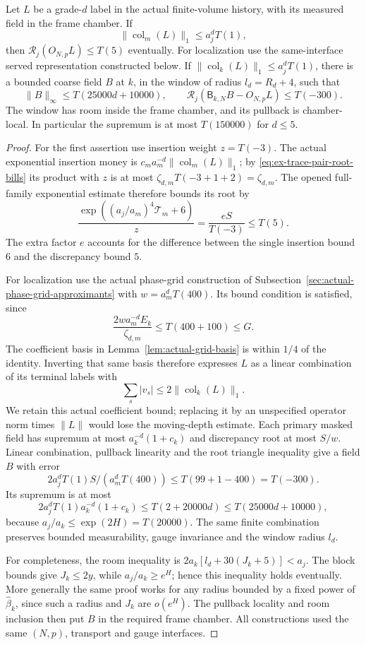 \begin{proposition}
\label{prop:ex-trace-pair-coefficient-production}
Let $L$ be a grade-$d$ label in the actual finite-volume history, with
its measured field in the frame chamber. If
\[
 \|\operatorname{col}_m(L)\|_1\le a_j^d T(1),
\]
then $\mathcal R_j(O_{N,p}L)\le T(5)$ eventually.
For localization use the same-interface served representation constructed
below. If
$\|\operatorname{col}_k(L)\|_1\le a_j^dT(1)$, there is a bounded
coarse field $B$ at $k$, in the window of radius
$l_d=R_d+4$, such that
\[
 \|B\|_\infty\le T(25000d+10000),\qquad
 \mathcal R_j(\mathsf B_{k,N}B-O_{N,p}L)\le T(-300).
\]
The window has room inside the frame chamber, and its pullback is
chamber-local. In particular the supremum is at most $T(150000)$
for $d\le5$.
\end{proposition}
\begin{proof}
For the first assertion use insertion weight $z=T(-3)$.
The actual exponential insertion money is
$c_m a_m^{-d}\|\operatorname{col}_m(L)\|_1$; by
\eqref{eq:ex-trace-pair-root-bills} its product with $z$ is at most
$\zeta_{d,m}T(-3+1+2)=\zeta_{d,m}$.
The opened full-family exponential estimate therefore bounds its root by
\[
 \frac{\exp((a_j/a_m)^4\mathcal T_m+6)}z
 =\frac{eS}{T(-3)}\le T(5).
\]
The extra factor $e$ accounts for the difference between the single
insertion bound $6$ and the discrepancy bound $5$.

For localization use the actual phase-grid construction of
Subsection~\ref{sec:actual-phase-grid-approximants} with
$w=a_m^dT(400)$. Its bound condition is satisfied, since
\[
 \frac{2wa_m^{-d}E_k}{\zeta_{d,m}}
 \le T(400+100)\le G.
\]
The coefficient basis in Lemma~\ref{lem:actual-grid-basis} is within
$1/4$ of the identity. Inverting that same basis therefore expresses
$L$ as a linear combination of its terminal labels with
\[
 \sum_s|v_s|\le2\|\operatorname{col}_k(L)\|_1.
\]
We retain this actual coefficient bound; replacing it by an unspecified
operator norm times $\|L\|$ would lose the moving-depth estimate.
Each primary masked field has supremum at most
$a_k^{-d}(1+c_k)$ and discrepancy root at most $S/w$.
Linear combination, pullback linearity and the root triangle inequality
give a field $B$ with error
\[
 2a_j^dT(1)S/(a_m^dT(400))\le T(99+1-400)=T(-300).
\]
Its supremum is at most
\[
 2a_j^dT(1)a_k^{-d}(1+c_k)
 \le T(2+20000d)\le T(25000d+10000),
\]
because $a_j/a_k\le\exp(2H)=T(20000)$.
The same finite combination preserves bounded measurability, gauge
invariance and the window radius $l_d$.

For completeness, the room inequality is
$2a_k[l_d+30(J_k+5)]<a_j$.
The block bounds give $J_k\le2y$, while $a_j/a_k\ge e^H$;
hence this inequality holds eventually. More generally the same proof
works for any radius bounded by a fixed power of $\widehat\beta_k$,
since such a radius and $J_k$ are $o(e^H)$.
The pullback locality and room inclusion then put $B$ in the required
frame chamber. All constructions used the same $(N,p)$, transport and
gauge interfaces.
\end{proof}

